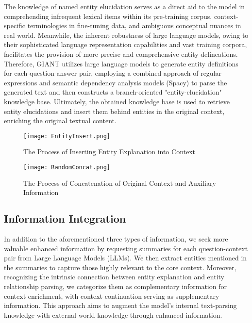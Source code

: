   The knowledge of named entity elucidation serves as a direct aid to the model in comprehending infrequent lexical items within its pre-training corpus, context-specific terminologies in fine-tuning data, and ambiguous conceptual nuances in real world. 
  Meanwhile, the inherent robustness of large language models, owing to their sophisticated language representation capabilities and vast training corpora, facilitates the provision of more precise and comprehensive entity delineations. 
  Therefore, GIANT utilizes large language models to generate entity definitions for each question-answer pair, employing a combined approach of regular expressions and semantic dependency analysis models (Spacy) to parse the generated text and then constructs a branch-oriented "entity-elucidation" knowledge base.
  Ultimately, the obtained knowledge base is used to retrieve entity elucidations and insert them behind entities in the original context, enriching the original textual content.
 
\label{sec:information_injection}
\begin{figure*}[h]
	\centering
	\texttt{[image: EntityInsert.png]}
	\caption{The Process of Inserting Entity Explanation into Context}
	\label{fig:entity_insertion}
\end{figure*}


\begin{figure*}[h]
	\centering
	\texttt{[image: RandomConcat.png]}
	\caption{The Process of Concatenation of Original Context and Auxiliary Information}
	\label{fig:random_concatenate}
\end{figure*}  

\subsection{Information Integration}
\label{sec:information_integration}
In addition to the aforementioned three types of information, we seek more valuable enhanced information by requesting summaries for each question-context pair from Large Language Models (LLMs). We then extract entities mentioned in the summaries to capture those highly relevant to the core context. Moreover, recognizing the intrinsic connection between entity explanation and entity relationship parsing, we categorize them as complementary information for context enrichment, with context continuation serving as supplementary information. This approach aims to augment the model's internal text-parsing knowledge with external world knowledge through enhanced information. 


